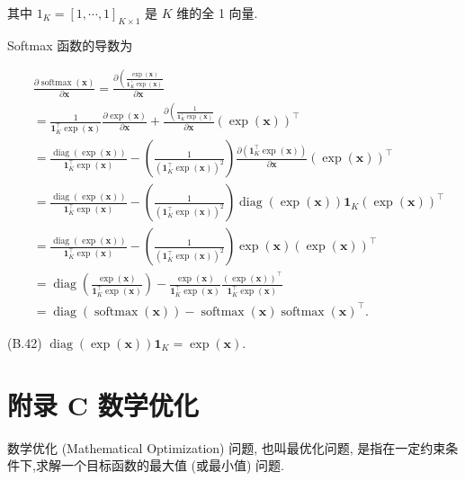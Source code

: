 \documentclass[10pt]{article}
\begin{document}
其中 $1_{K}=[1, \cdots, 1]_{K \times 1}$ 是 $K$ 维的全 1 向量.

Softmax 函数的导数为


\begin{align*}
& \frac{\partial \operatorname{softmax}(\boldsymbol{x})}{\partial \boldsymbol{x}}=\frac{\partial\left(\frac{\exp (\boldsymbol{x})}{\mathbf{1}_{K}^{\top} \exp (\boldsymbol{x})}\right.}{\partial \boldsymbol{x}}  \tag{B.39}\\
& =\frac{1}{\mathbf{1}_{K}^{\top} \exp (\boldsymbol{x})} \frac{\partial \exp (\boldsymbol{x})}{\partial \boldsymbol{x}}+\frac{\partial\left(\frac{1}{\mathbf{1}_{K}^{\top} \exp (\boldsymbol{x})}\right.}{\partial \boldsymbol{x}}(\exp (\boldsymbol{x}))^{\top}  \tag{B.40}\\
& =\frac{\operatorname{diag}(\exp (\boldsymbol{x}))}{\mathbf{1}_{K}^{\top} \exp (\boldsymbol{x})}-\left(\frac{1}{\left(\mathbf{1}_{K}^{\top} \exp (\boldsymbol{x})\right)^{2}}\right) \frac{\partial\left(\mathbf{1}_{K}^{\top} \exp (\boldsymbol{x})\right)}{\partial \boldsymbol{x}}(\exp (\boldsymbol{x}))^{\top}  \tag{B.41}\\
& =\frac{\operatorname{diag}(\exp (\boldsymbol{x}))}{\mathbf{1}_{K}^{\top} \exp (\boldsymbol{x})}-\left(\frac{1}{\left(\mathbf{1}_{K}^{\top} \exp (\boldsymbol{x})\right)^{2}}\right) \operatorname{diag}(\exp (\boldsymbol{x})) \mathbf{1}_{K}(\exp (\boldsymbol{x}))^{\top} \\
& =\frac{\operatorname{diag}(\exp (\boldsymbol{x}))}{\mathbf{1}_{K}^{\top} \exp (\boldsymbol{x})}-\left(\frac{1}{\left(\mathbf{1}_{K}^{\top} \exp (\boldsymbol{x})\right)^{2}}\right) \exp (\boldsymbol{x})(\exp (\boldsymbol{x}))^{\top}  \tag{B.43}\\
& =\operatorname{diag}\left(\frac{\exp (\boldsymbol{x})}{\mathbf{1}_{K}^{\top} \exp (\boldsymbol{x})}\right)-\frac{\exp (\boldsymbol{x})}{\mathbf{1}_{K}^{\top} \exp (\boldsymbol{x})} \frac{(\exp (\boldsymbol{x}))^{\top}}{\mathbf{1}_{K}^{\top} \exp (\boldsymbol{x})}  \tag{B.44}\\
& =\operatorname{diag}(\operatorname{softmax}(\boldsymbol{x}))-\operatorname{softmax}(\boldsymbol{x}) \operatorname{softmax}(\boldsymbol{x})^{\top} . \tag{B.45}
\end{align*}


(B.42) $\operatorname{diag}(\exp (\boldsymbol{x})) \boldsymbol{1}_{K}=\exp (\boldsymbol{x})$.

\section*{附录 C 数学优化}
数学优化 (Mathematical Optimization) 问题, 也叫最优化问题, 是指在一定约束条件下,求解一个目标函数的最大值 (或最小值) 问题.
\end{document}
